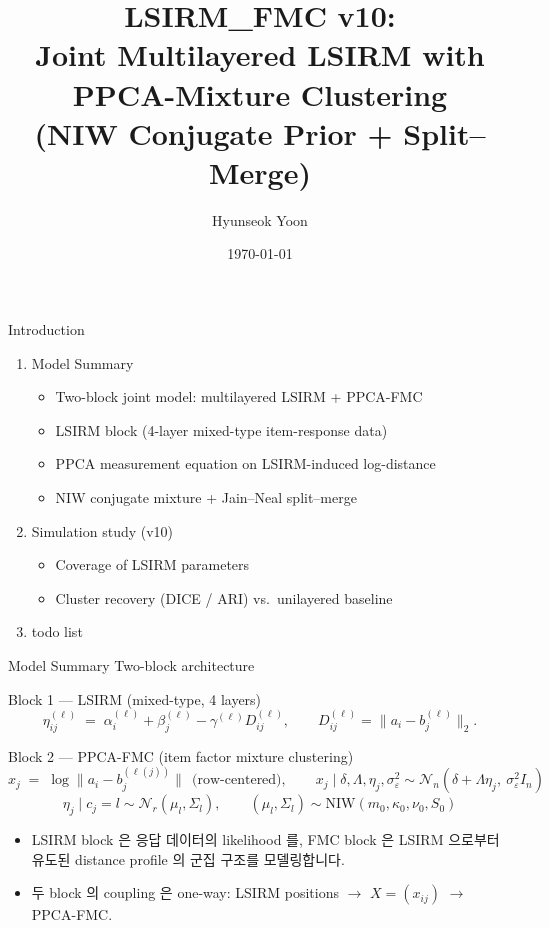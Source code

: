 \documentclass{beamer}
\title[LSIRM\_FMC v10]{LSIRM\_FMC v10:\\ Joint Multilayered LSIRM with PPCA-Mixture Clustering\\ (NIW Conjugate Prior + Split--Merge)}
\author{Hyunseok Yoon}
\institute[Yonsei University]
{
Yonsei University \\
\medskip
\textit{}
}
\date{\today}
\begin{document}
\begin{frame}
\titlepage
\end{frame}

\begin{frame}{Introduction}
\begin{enumerate}
    \item Model Summary
    \begin{itemize}
        \item Two-block joint model: multilayered LSIRM + PPCA-FMC
        \item LSIRM block (4-layer mixed-type item-response data)
        \item PPCA measurement equation on LSIRM-induced log-distance
        \item NIW conjugate mixture + Jain--Neal split--merge
    \end{itemize}
    \item Simulation study (v10)
    \begin{itemize}
        \item Coverage of LSIRM parameters
        \item Cluster recovery (DICE / ARI) vs.\ unilayered baseline
    \end{itemize}
    \item todo list
\end{enumerate}
\end{frame}

\begin{frame}{Model Summary}
{Two-block architecture}

\begin{block}{Block 1 --- LSIRM (mixed-type, 4 layers)}
\[
\eta^{(\ell)}_{ij} \;=\; \alpha^{(\ell)}_i + \beta^{(\ell)}_j - \gamma^{(\ell)} D^{(\ell)}_{ij},
\qquad D^{(\ell)}_{ij} = \|a_i - b^{(\ell)}_j\|_2.
\]
\end{block}

\begin{block}{Block 2 --- PPCA-FMC (item factor mixture clustering)}
\[
x_j \;=\; \log \|a_i - b^{(\ell(j))}_j\| ~~\text{(row-centered)}, \qquad
x_j \mid \delta,\Lambda,\eta_j,\sigma_\varepsilon^2 \sim \mathcal{N}_n(\delta + \Lambda \eta_j,\ \sigma_\varepsilon^2 I_n)
\]
\[
\eta_j \mid c_j = l \sim \mathcal{N}_r(\mu_l, \Sigma_l), \qquad
(\mu_l, \Sigma_l) \sim \mathrm{NIW}(m_0, \kappa_0, \nu_0, S_0)
\]
\end{block}

\begin{itemize}
    \item LSIRM block 은 응답 데이터의 likelihood 를, FMC block 은 LSIRM 으로부터 유도된 distance profile 의 군집 구조를 모델링합니다.
    \item 두 block 의 coupling 은 one-way: LSIRM positions $\to$ $X = (x_{ij})$ $\to$ PPCA-FMC.
\end{itemize}
\end{frame}
\end{document}
